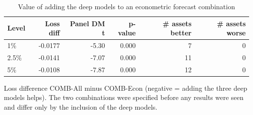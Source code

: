 \begin{table}[htbp]
\centering
\footnotesize
\caption{Value of adding the deep models to an econometric forecast combination}
\label{tab:combo}
\begin{tabular}{lrrrrr}
\toprule
Level & Loss diff & Panel DM t & p-value & \# assets better & \# assets worse \\
\midrule
1\% & -0.0177 & -5.30 & 0.000 & 7 & 0 \\
2.5\% & -0.0141 & -7.07 & 0.000 & 11 & 0 \\
5\% & -0.0108 & -7.87 & 0.000 & 12 & 0 \\
\bottomrule
\end{tabular}
\par\smallskip\parbox{\linewidth}{\scriptsize Loss difference COMB-All minus COMB-Econ (negative = adding the three deep models helps). The two combinations were specified before any results were seen and differ only by the inclusion of the deep models.}
\end{table}